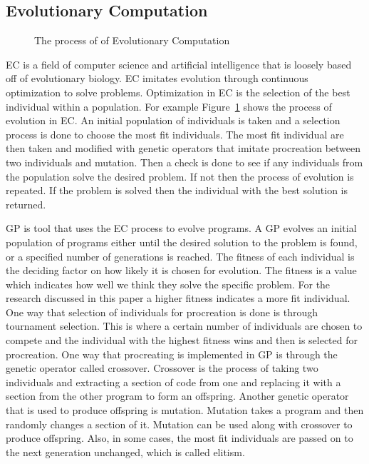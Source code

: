 \documentclass{sig-alternate}
\begin{document}
\subsection{Evolutionary Computation}
\begin{figure}
\centering
{}

\caption{The process of of Evolutionary Computation}
\label{ECdiagram}
\end{figure}


EC is a field of computer science and artificial intelligence that is loosely based off of evolutionary biology. EC imitates evolution through continuous optimization to solve problems. Optimization in EC is the selection of the best individual within a population. For example Figure~\ref{ECdiagram} shows the process of evolution in EC. An initial population of individuals is taken and a selection process is done to choose the most fit individuals. The most fit individual are then taken and modified with genetic operators that imitate procreation between two individuals and mutation. Then a check is done to see if any individuals from the population solve the desired problem. If not then the process of evolution is repeated. If the problem is solved then the individual with the best solution is returned.\par
	GP is tool that uses the EC process to evolve programs. A GP evolves an initial population of programs either until the desired solution to the problem is found, or a specified number of generations is reached. The fitness of each individual is the deciding factor on how likely it is chosen for evolution. The fitness is a value which indicates how well we think they solve the specific problem. For the research discussed in this paper a higher fitness indicates a more fit individual. One way that selection of individuals for procreation is done is through tournament selection. This is where a certain number of individuals are chosen to compete and the individual with the highest fitness wins and then is selected for procreation. One way that procreating is implemented in GP is through the genetic operator called crossover. Crossover is the process of taking two individuals and extracting a section of code from one and replacing it with a section from the other program to form an offspring. Another genetic operator that is used to produce offspring is mutation. Mutation takes a program and then randomly changes a section of it. Mutation can be used along with crossover to produce offspring. Also, in some cases, the most fit individuals are passed on to the next generation unchanged, which is called elitism.
\end{document}
